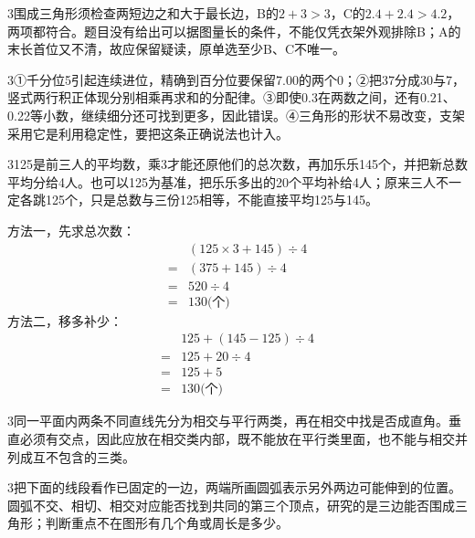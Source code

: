 \documentclass[multi=snippet,border={5bp 20bp 5bp 5bp}]{standalone}
\newenvironment{snippet}[3]{\begin{minipage}{#1bp}\color{answerred}\fontsize{#2}{#3}\selectfont\raggedright}{\end{minipage}}
\begin{document}
\begin{snippet}{505}{11.5}{14}\begin{multicols}{3}\raggedcolumns 围成三角形须检查两短边之和大于最长边，B的\(2+3>3\)\allowbreak ，C的\(2.4+2.4>4.2\)\allowbreak ，两项都符合。题目没有给出可以据图量长的条件，不能仅凭衣架外观排除B；A的末长首位又不清，故应保留疑读，原单选至少B、C不唯一。\end{multicols}\end{snippet}
\begin{snippet}{505}{11.5}{14}\begin{multicols}{3}\raggedcolumns ①千分位5引起连续进位，精确到百分位要保留7.00的两个0；②把37分成30与7，竖式两行积正体现分别相乘再求和的分配律。③即使0.3在两数之间，还有0.21、0.22等小数，继续细分还可找到更多，因此错误。④三角形的形状不易改变，支架采用它是利用稳定性，要把这条正确说法也计入。\end{multicols}\end{snippet}
\begin{snippet}{505}{11.5}{14}\begin{multicols}{3}\raggedcolumns 125是前三人的平均数，乘3才能还原他们的总次数，再加乐乐145个，并把新总数平均分给4人。也可以125为基准，把乐乐多出的20个平均补给4人；原来三人不一定各跳125个，只是总数与三份125相等，不能直接平均125与145。\par 方法一，先求总次数：\[\begin{aligned}&(125\times3+145)\div4\\={}&(375+145)\div4\\={}&520\div4\\={}&130\text{(个)}\end{aligned}\]方法二，移多补少：\[\begin{aligned}&125+(145-125)\div4\\={}&125+20\div4\\={}&125+5\\={}&130\text{(个)}\end{aligned}\]\end{multicols}\end{snippet}
\begin{snippet}{505}{11.5}{14}\begin{multicols}{3}\raggedcolumns 同一平面内两条不同直线先分为相交与平行两类，再在相交中找是否成直角。垂直必须有交点，因此应放在相交类内部，既不能放在平行类里面，也不能与相交并列成互不包含的三类。\end{multicols}\end{snippet}
\begin{snippet}{505}{11.5}{14}\begin{multicols}{3}\raggedcolumns 把下面的线段看作已固定的一边，两端所画圆弧表示另外两边可能伸到的位置。圆弧不交、相切、相交对应能否找到共同的第三个顶点，研究的是三边能否围成三角形；判断重点不在图形有几个角或周长是多少。\end{multicols}\end{snippet}
\end{document}
